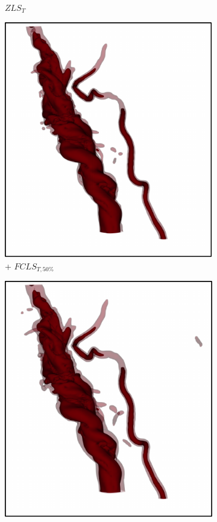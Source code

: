 \begin{figure}[!h]
\begin{subfigure}{0.20\linewidth}
\vspace{-1mm}
\caption{$ZLS_{T}$}
\label{fig:tornado_zls}
\end{subfigure}
\begin{subfigure}{0.20\linewidth}
\centering
\includegraphics[width=0.9\linewidth]{Images/Tornado/fcls_50.pdf}
\vspace{-1mm}
\caption{+ $FCLS_{T,50\%}$}
\label{fig:tornado_fls}
\end{subfigure}
\begin{subfigure}{0.20\linewidth}
\centering
\includegraphics[width=0.9\linewidth]{Images/Tornado/fcls_68.pdf}

\end{subfigure}
\end{figure}
